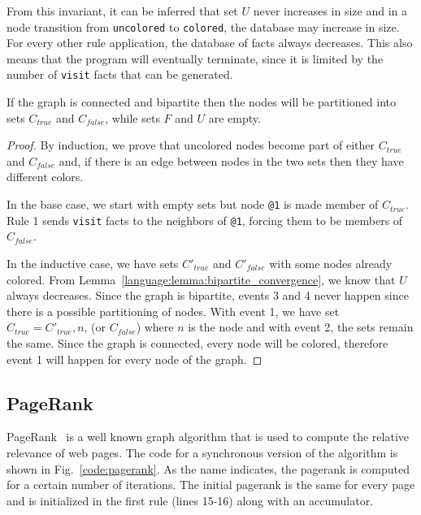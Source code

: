 From this invariant, it can be inferred that set $U$ never increases in size
and in a node transition from \texttt{uncolored} to \texttt{colored}, the
database may increase in size. For every other rule application, the database of
facts always decreases. This also means that the program will eventually
terminate, since it is limited by the number of \texttt{visit} facts that can be
generated.

\begin{theorem}
If the graph is connected and bipartite then the nodes will be partitioned into
sets $C_{true}$ and $C_{false}$, while sets $F$ and $U$ are empty.
\end{theorem}
\begin{proof}
   By induction, we prove that uncolored nodes become part of either $C_{true}$
   and $C_{false}$ and, if there is an edge between nodes in the two sets then
   they have different colors.

   In the base case, we start with empty sets but node \texttt{@1} is made
   member of $C_{true}$. Rule 1 sends \texttt{visit} facts to the neighbors of
   \texttt{@1}, forcing them to be members of $C_{false}$.

   In the inductive case, we have sets $C'_{true}$ and $C'_{false}$ with some
   nodes already colored. From Lemma~\ref{language:lemma:bipartite_convergence},
   we know that $U$ always decreases. Since the graph is bipartite, events 3 and
   4 never happen since there is a possible partitioning of nodes. With event 1,
   we have set $C_{true} = C'_{true}, n$, (or $C_{false}$) where $n$ is the
   node and with event 2, the sets remain the same. Since the graph is
   connected, every node will be colored, therefore event 1 will happen for
   every node of the graph.
\end{proof}

\subsection{PageRank}

PageRank~\cite{Page:2001:MNR} is a well known graph algorithm that is used to
compute the relative relevance of web pages.  The code for a synchronous version
of the algorithm is shown in Fig.~\ref{code:pagerank}.  As the name indicates,
the pagerank is computed for a certain number of iterations. The initial
pagerank is the same for every page and is initialized in the first rule (lines
15-16) along with an accumulator.

